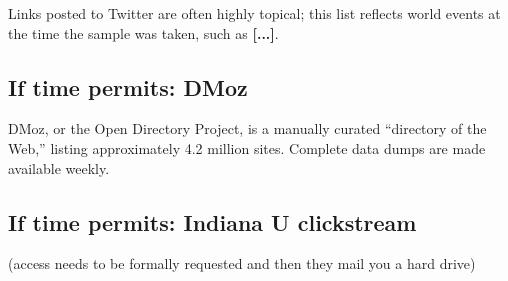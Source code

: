 \documentclass{zarticle}
\def\todo#1{{\color{todocolor}\bfseries [#1]}}
\begin{document}
Links posted to Twitter are often highly topical; this list reflects
world events at the time the sample was taken, such as \todo{...}.

\subsection{If time permits: DMoz}

DMoz, or the Open Directory Project, is a manually curated “directory
of the Web,” listing approximately 4.2 million sites.  Complete data
dumps are made available weekly.

\subsection{If time permits: Indiana U clickstream}

(access needs to be formally requested and then they mail you a hard drive)

\printbibliography
\end{document}
